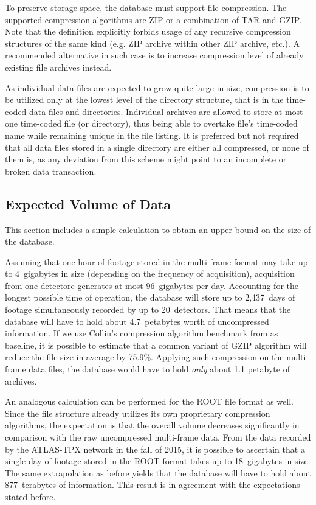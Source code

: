 
To preserve storage space, the database must support file compression. The supported compression algorithms are ZIP or a combination of TAR and GZIP. Note that the definition explicitly forbids usage of any recursive compression structures of the same kind (e.g. ZIP archive within other ZIP archive, etc.). A recommended alternative in such case is to increase compression level of already existing file archives instead.

As individual data files are expected to grow quite large in size, compression is to be utilized only at the lowest level of the directory structure, that is in the time-coded data files and directories. Individual archives are allowed to store at most one time-coded file (or directory), thus being able to overtake file's time-coded name while remaining unique in the file listing. It is preferred but not required that all data files stored in a single directory are either all compressed, or none of them is, as any deviation from this scheme might point to an incomplete or broken data transaction.

\subsection{Expected Volume of Data}
This section includes a simple calculation to obtain an upper bound on the size of the database.

Assuming that one hour of footage stored in the multi-frame format may take up to 4~gigabytes in size (depending on the frequency of acquisition), acquisition from one detectore generates at most 96~gigabytes per day. Accounting for the longest possible time of operation, the database will store up to 2,437~days of footage simultaneously recorded by up to 20~detectors. That means that the database will have to hold about 4.7~petabytes worth of uncompressed information. If we use Collin's compression algorithm benchmark from \cite{GzipBenchmark} as baseline, it is possible to estimate that a common variant of GZIP algorithm will reduce the file size in average by 75.9\%. Applying such compression on the multi-frame data files, the database would have to hold \textit{only} about 1.1 petabyte of archives.

An analogous calculation can be performed for the ROOT file format as well. Since the file structure already utilizes its own proprietary compression algorithms, the expectation is that the overall volume decreases significantly in comparison with the raw uncompressed multi-frame data. From the data recorded by the ATLAS-TPX network in the fall of 2015, it is possible to ascertain that a single day of footage stored in the ROOT format takes up to 18~gigabytes in size. The same extrapolation as before yields that the database will have to hold about 877~terabytes of information. This result is in agreement with the expectations stated before.

